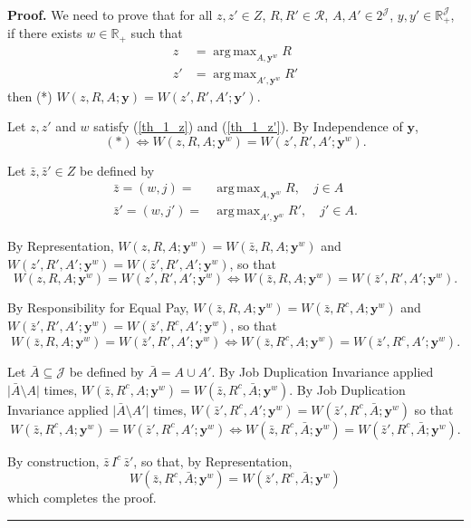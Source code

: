 \documentclass[12pt,thmsb]{article}
\DeclareMathOperator*{\argmax}{arg\,max}
\newenvironment{proof}[1][Proof]{\noindent \textbf{#1.} }{\  \rule{0.5em}{0.5em}}
\begin{document}
\begin{proof}
We need to prove that for all $z,z'\in Z$, $R,R'\in\mathcal{R}$, $A,A'\in 2^{\mathcal{J}}$, $y,y'\in\mathbb{R}_{+}^{\mathcal{J}}$, if there exists $w\in\mathbb{R}_{+}$ such that
\begin{align}
z &= \argmax_{A,\mathbf{y}^w}R \label{th_1_z}\\
z' &= \argmax_{A',\mathbf{y}^w}R' \label{th_1_z'}
\end{align}
then (*) $W(z,R,A;\mathbf{y})=W(z',R',A';\mathbf{y}')$.

Let $z,z'$ and $w$ satisfy (\ref{th_1_z}) and (\ref{th_1_z'}). By Independence of $\mathbf{y}$,
\begin{equation*}
(*)\Leftrightarrow W(z,R,A;\mathbf{y}^w)=W(z',R',A';\mathbf{y}^w).
\end{equation*}

Let $\bar{z},\bar{z}'\in Z$ be defined by
\begin{align*}
\bar{z}=(w,j)=& \argmax_{A,\mathbf{y}^w}R, \quad j\in A\\
\bar{z}'=(w,j')=& \argmax_{A',\mathbf{y}^w}R', \quad j'\in A.
\end{align*}

By Representation, $W(z,R,A;\mathbf{y}^w)=W(\bar{z},R,A;\mathbf{y}^w)$ and $W(z',R',A';\mathbf{y}^w)=W(\bar{z}',R',A';\mathbf{y}^w)$, so that
\begin{equation*}
W(z,R,A;\mathbf{y}^w)=W(z',R',A';\mathbf{y}^w) \Leftrightarrow W(\bar{z},R,A;\mathbf{y}^w)=W(\bar{z}',R',A';\mathbf{y}^w).
\end{equation*}

By Responsibility for Equal Pay, $W(\bar{z},R,A;\mathbf{y}^w)=W(\bar{z},R^c,A;\mathbf{y}^w)$ and $W(\bar{z}',R',A';\mathbf{y}^w)=W(\bar{z}',R^c,A';\mathbf{y}^w)$, so that
\begin{equation*}
W(\bar{z},R,A;\mathbf{y}^w)=W(\bar{z}',R',A';\mathbf{y}^w) \Leftrightarrow W(\bar{z},R^c,A;\mathbf{y}^w)=W(\bar{z}',R^c,A';\mathbf{y}^w).
\end{equation*}

Let $\bar{A}\subseteq\mathcal{J}$ be defined by $\bar{A}=A\cup A'$. By Job Duplication Invariance applied $\lvert \bar{A}\setminus A \rvert$ times, $W(\bar{z},R^c,A;\mathbf{y}^w)=W(\bar{z},R^c,\bar{A};\mathbf{y}^w)$. By Job Duplication Invariance applied $\lvert \bar{A}\setminus A' \rvert$ times, $W(\bar{z}',R^c,A';\mathbf{y}^w)=W(\bar{z}',R^c,\bar{A};\mathbf{y}^w)$ so that
\begin{equation*}
W(\bar{z},R^c,A;\mathbf{y}^w)=W(\bar{z}',R^c,A';\mathbf{y}^w) \Leftrightarrow W(\bar{z},R^c,\bar{A};\mathbf{y}^w)=W(\bar{z}',R^c,\bar{A};\mathbf{y}^w).
\end{equation*}

By construction, $\bar{z}\,I^c\,\bar{z}'$, so that, by Representation,
\begin{equation*}
W(\bar{z},R^c,\bar{A};\mathbf{y}^w)=W(\bar{z}',R^c,\bar{A};\mathbf{y}^w)
\end{equation*}
which completes the proof.
\end{proof}
\end{document}
